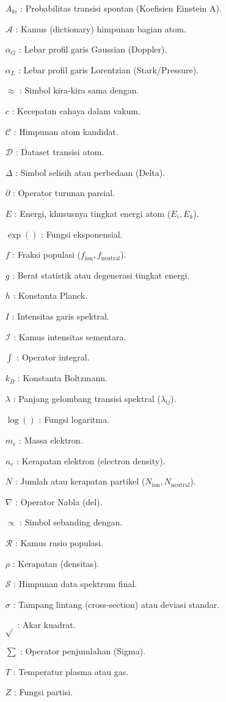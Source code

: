 \singkatan
\begin{itemize}[itemsep=0pt, parsep=0pt]
    \item[$A_{ki}$] : Probabilitas transisi spontan (Koefisien Einstein A).
    \item[$\mathcal{A}$] : Kamus (dictionary) himpunan bagian atom.
    \item[$\alpha_G$] : Lebar profil garis Gaussian (Doppler).
    \item[$\alpha_L$] : Lebar profil garis Lorentzian (Stark/Pressure).
    \item[$\approx$] : Simbol kira-kira sama dengan.
    \item[$c$] : Kecepatan cahaya dalam vakum.
    \item[$\mathcal{C}$] : Himpunan atom kandidat.
    \item[$\mathcal{D}$] : Dataset transisi atom.
    \item[$\Delta$] : Simbol selisih atau perbedaan (Delta).
    \item[$\partial$] : Operator turunan parsial.
    \item[$E$] : Energi, khususnya tingkat energi atom ($E_i, E_k$).
    \item[$\exp()$] : Fungsi eksponensial.
    \item[$f$] : Fraksi populasi ($f_{\text{ion}}, f_{\text{neutral}}$).
    \item[$g$] : Berat statistik atau degenerasi tingkat energi.
    \item[$h$] : Konstanta Planck.
    \item[$I$] : Intensitas garis spektral.
    \item[$\mathcal{I}$] : Kamus intensitas sementara.
    \item[$\int$] : Operator integral.
    \item[$k_B$] : Konstanta Boltzmann.
    \item[$\lambda$] : Panjang gelombang transisi spektral ($\lambda_{ij}$).
    \item[$\log()$] : Fungsi logaritma.
    \item[$m_e$] : Massa elektron.
    \item[$n_e$] : Kerapatan elektron (electron density).
    \item[$N$] : Jumlah atau kerapatan partikel ($N_{\text{ion}}, N_{\text{neutral}}$).
    \item[$\nabla$] : Operator Nabla (del).
    \item[$\propto$] : Simbol sebanding dengan.
    \item[$\mathcal{R}$] : Kamus rasio populasi.
    \item[$\rho$] : Kerapatan (densitas).
    \item[$\mathcal{S}$] : Himpunan data spektrum final.
    \item[$\sigma$] : Tampang lintang (cross-section) atau deviasi standar.
    \item[$\sqrt{}$] : Akar kuadrat.
    \item[$\sum$] : Operator penjumlahan (Sigma).
    \item[$T$] : Temperatur plasma atau gas.
    \item[$Z$] : Fungsi partisi.
\end{itemize}
